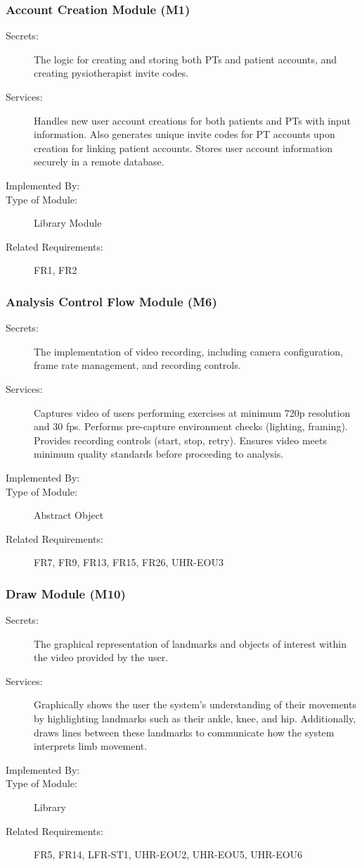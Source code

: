 \documentclass[12pt, titlepage]{article}
\begin{document}
\subsubsection{Account Creation Module (M1)}
\begin{description}
    \item[Secrets:] The logic for creating and storing both PTs and patient accounts, and creating pysiotherapist invite codes.
    \item[Services:] Handles new user account creations for both patients and PTs with input information. Also generates unique invite codes for PT accounts upon creation for linking patient accounts. Stores user account information securely in a remote database.
    \item[Implemented By:] \progname{}
    \item[Type of Module:] Library Module
    \item[Related Requirements:] FR1, FR2
\end{description}

\subsubsection{Analysis Control Flow Module (M6)}
\begin{description}
	\item[Secrets:] The implementation of video recording, including camera configuration, frame rate management, and recording controls.
	\item[Services:] Captures video of users performing exercises at minimum 720p resolution and 30 fps. Performs pre-capture environment checks (lighting, framing). Provides recording controls (start, stop, retry). Ensures video meets minimum quality standards before proceeding to analysis.
	\item[Implemented By:] \progname{}
	\item[Type of Module:] Abstract Object
	\item[Related Requirements:] FR7, FR9, FR13, FR15, FR26, UHR-EOU3
\end{description}

\subsubsection{Draw Module (M10)}
\begin{description}
	\item[Secrets:] The graphical representation of landmarks and objects of interest within the video provided by the user.
	\item[Services:] Graphically shows the user the system's understanding of their movements by highlighting landmarks such as their ankle, knee, and hip. Additionally, draws lines between these landmarks to communicate how the system interprets limb movement.
	\item[Implemented By:] \progname{}
	\item[Type of Module:] Library
	\item[Related Requirements:] FR5, FR14, LFR-ST1, UHR-EOU2, UHR-EOU5, UHR-EOU6
\end{description}
\end{document}
